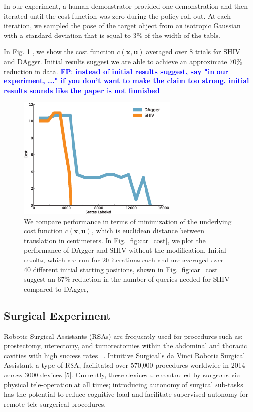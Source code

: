\documentclass[10pt, conference]{ieeeconf}      %
\newcommand{\bu}{\mathbf{u}}
\newcommand{\bx}{\mathbf{x}}
\newcommand{\fpnote}[1]{\ifthenelse{\boolean{include-notes}}%
 {\textcolor{blue}{\textbf{FP: #1}}}{}}
\begin{document}
In our experiment, a human demonstrator provided one demonstration and then iterated until the cost function was zero during the policy roll out. At each iteration, we sampled the pose of the target object from an isotropic Gaussian with a standard deviation that is equal to $3\%$ of the width of the table. 

In Fig. \ref{fig:grasp_cost} , we show the cost function $c(\bx,\bu)$ averaged over 8 trials for SHIV and DAgger.
Initial results suggest we are able to achieve an approximate $70\%$ reduction in data. \fpnote{instead of initial
results suggest, say "in our experiment, ..." if you don't want to make the claim too strong. initial results sounds
like the paper is not finnished} 

\begin{figure}[t!]
\centering
\includegraphics[width=\columnwidth, height=6cm]{figures/grasp_clutter.eps}
\caption{We compare performance in terms of minimization of the underlying cost function $c(\bx,\bu)$, which is euclidean distance between translation in centimeters. In Fig. \ref{fig:car_cost}, we plot the performance of DAgger and SHIV without the modification.  Initial results, which are run for 20 iterations each and are averaged over 40 different initial starting positions, shown in Fig. \ref{fig:car_cost} suggest an $67\%$ reduction in the number of queries needed for SHIV compared to DAgger,}
\vspace*{-10pt}
\label{fig:grasp_cost}
\end{figure}




\subsection{Surgical Experiment}
Robotic Surgical Assistants (RSAs) are frequently used for procedures such as: prostectomy, uterectomy, and tumorectomies within the abdominal and thoracic cavities with high success rates~\cite{van2013laparoscopic,darzi2004impact} . Intuitive Surgical’s da Vinci Robotic Surgical Assistant, a type of RSA, facilitated over 570,000 procedures worldwide in 2014 across 3000 devices [5]. Currently, these devices are controlled by surgeons via physical tele-operation at all times; introducing autonomy of surgical sub-tasks has the potential to reduce cognitive load
and facilitate supervised autonomy for remote tele-surgerical procedures.
\end{document}
